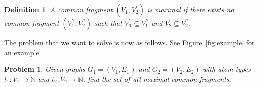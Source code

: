 \documentclass[11pt]{article}
\newtheorem{problem}{Problem}[section]
\newtheorem{definition}{Definition}[section]
\begin{document}
\begin{definition}
A common fragment $(V^\prime_1,V^\prime_2)$ is \emph{maximal} if
there exists no common fragment $(V^{\prime\prime}_1,V^{\prime\prime}_2)$ such
that $V^\prime_1 \subseteq V^{\prime\prime}_1$ and $V^\prime_2 \subseteq
V^{\prime\prime}_2$.
\end{definition}

The problem that we want to solve is now as follows. See
Figure~\ref{fig:example} for an example.

\begin{problem}
Given graphs $G_1 = (V_1, E_1)$ and $G_2 = (V_2, E_2)$ with atom types $t_1 :
V_1 \rightarrow \mathbb{N}$ and $t_2 : V_2 \rightarrow \mathbb{N}$, find the
set of all maximal common fragments.
\end{problem}
\end{document}
